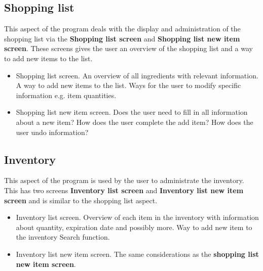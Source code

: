 \subsection{Shopping list}
This aspect of the program deals with the display and administration of the shopping list via the \textbf{Shopping list screen} and \textbf{Shopping list new item screen}. These screens gives the user an overview of the shopping list and a way to add new items to the list.

\begin{itemize}
	\item Shopping list screen.
		\subitem An overview of all ingredients with relevant information.
		\subitem A way to add new items to the list.
		\subitem Ways for the user to modify specific information e.g. item quantities.
	\item Shopping list new item screen.
		\subitem Does the user need to fill in all information about a new item?
		\subitem How does the user complete the add item?
		\subitem How does the user undo information? 
\end{itemize}

\subsection{Inventory}
This aspect of the program is used by the user to administrate the inventory. This has two screens
\textbf{Inventory list screen} and \textbf{Inventory list new item screen} and is similar to the shopping list aspect. 
    
\begin{itemize}
	\item Inventory list screen.
		\subitem Overview of each item in the inventory with information about quantity, expiration date and possibly more.
		\subitem Way to add new item to the inventory
		\subitem Search function.
	\item Inventory list new item screen.
		\subitem The same considerations as the \textbf{shopping list new item screen}.
\end{itemize}


